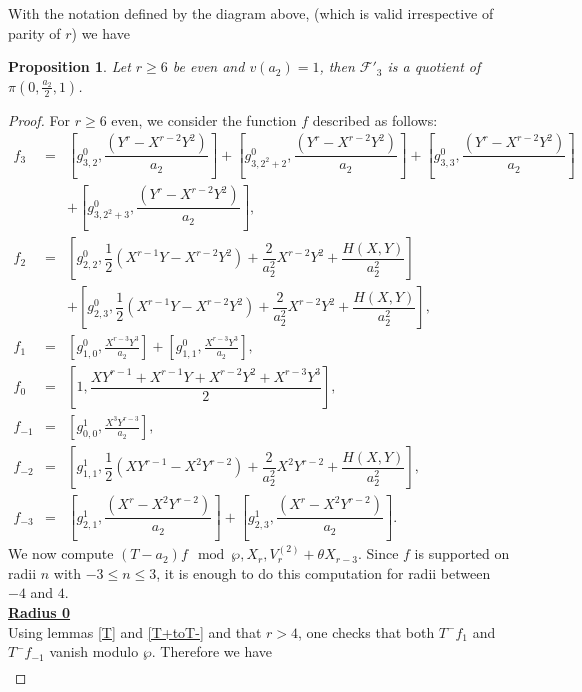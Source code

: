 \documentclass[11pt, reqno]{amsart}
\numberwithin{equation}{section}
\newtheorem{prop}[thm]{Proposition}
\theoremstyle{definition}
\theoremstyle{remark}
\theoremstyle{definition}
\theoremstyle{remark}
\theoremstyle{remark}
\begin{document}
With the notation defined by the diagram above, (which is valid irrespective of parity of $r$) we have

\begin{prop}\label{F3'}
    Let $r\geq 6$ be even and $v(a_{2})=1$, then $\mathcal{F'}_{3}$ is a quotient of $\pi(0,\frac{a_{2}}{2},1)$. 
\end{prop}
\begin{proof}
For $r\geq 6$ even, we consider the function $f$ described as follows:
  \begin{eqnarray}
  	f_{3}&=& \left[g_{3,2}^{0}, \dfrac{(Y^{r}-X^{r-2}Y^{2})}{a_{2}}\right] + \left[g_{3,2^{2}+2}^{0},\dfrac{(Y^{r}-X^{r-2}Y^{2})}{a_{2}}\right] + \left[g_{3,3}^{0}, \dfrac{(Y^{r}-X^{r-2}Y^{2})}{a_{2}}\right]\nonumber\\
  	&& + \left[g_{3,2^{2}+3}^{0},\dfrac{(Y^{r}-X^{r-2}Y^{2})}{a_{2}} \right],\nonumber\\
	f_{2} &=&  \left[g_{2,2}^{0}, \dfrac{1}{2}(X^{r-1}Y-X^{r-2}Y^{2})+ \dfrac{2}{a_{2}^{2}}X^{r-2}Y^{2} + \dfrac{H(X,Y)}{a_{2}^{2}}\right]\nonumber\\
	&  & + \left[g_{2,3}^{0}, \dfrac{1}{2}(X^{r-1}Y-X^{r-2}Y^{2})+ \dfrac{2}{a_{2}^{2}}X^{r-2}Y^{2} + \dfrac{H(X,Y)}{a_{2}^{2}}\right],\nonumber\\
	f_{1} &= & \left[g_{1,0}^{0}, \frac{X^{r-3}Y^{3}}{a_{2}} \right]
	 + 
	\left[g_{1,1}^{0}, \frac{X^{r-3}Y^{3}}{a_{2}} \right],\nonumber\\
	f_{0} &=& \left[1, \dfrac{XY^{r-1}+X^{r-1}Y + X^{r-2}Y^{2} + X^{r-3}Y^{3}}{2}\right],\nonumber\\
	f_{-1} & =& \left[g_{0,0}^{1}, \frac{ X^{3}Y^{r-3}}{a_{2}} \right],\nonumber\\
	f_{-2} & = & \left[g_{1,1}^{1},\dfrac{1}{2}(XY^{r-1}-X^{2}Y^{r-2})+ \dfrac{2}{a_{2}^{2}}X^{2}Y^{r-2} + \dfrac{H(X,Y)}{a_{2}^{2}}\right], \nonumber\\
	f_{-3} &=& \left[g_{2,1}^{1}, \dfrac{(X^{r}-X^{2}Y^{r-2})}{a_{2}}\right] + \left[g_{2,3}^{1},\dfrac{(X^{r}-X^{2}Y^{r-2})}{a_{2}}\right]. \label{F3'eqeven}
\end{eqnarray}
We now compute $(T-a_{2})f \mod \wp, X_{r}, V_{r}^{(2)}+\theta X_{r-3} $. Since $f$ is supported on radii $n$ with $-3\leq n\leq 3$, it is enough to do this computation for radii between  $-4$ and $4$.\\
\noindent \underline{\textbf{Radius 0}}\\
Using lemmas \ref{T} and \ref{T+toT-} and that $r>4$, one checks that both $T^-f_1$ and $T^-f_{-1}$ vanish modulo $ \wp$. Therefore we have \begin{eqnarray}

\end{eqnarray}
\end{proof}
\end{document}
